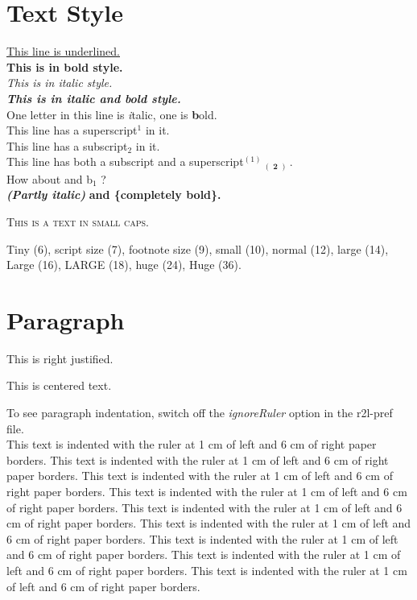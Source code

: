 \documentclass{article}
\begin{document}
\section*{Text Style}
{\underline {This line is underlined.}}\\{}
\textbf{This is in bold style.}\\{}
\textit{This is in italic style.}\\{}
\textbf{\textit{This is in italic and bold style.}}\\{}
One letter in this line is \textit{i}talic, one is \textbf{b}old.\\{}
This line has a superscript$ ^{1} $  in it.\\{}
This line has a subscript$ _{2} $  in it.\\{}
This line has both a subscript and a superscript$ ^{(1)} $ $ _{(} $ $ _{\mathbf{2}} $ $ _{)} $ .\\{}
How about  and b$ _{1} $ ?\\{}
\textbf{\textit{(Partly italic)}} \textbf{and \{completely bold\}.}


\textsc{This is a text in small caps.}

{\scriptsize Tiny (6),} {\footnotesize script size (7),} {\small footnote size (9),} small 
(10), normal (12), {\large large (14),} {\Large Large (16),} {\LARGE LARGE (18),} {\huge huge 
(24),} {\Huge Huge (36).}



\section*{Paragraph}

\begin{flushright}
This is right justified.


\end{flushright}

\begin{center}
This is centered text.


\end{center}

To see paragraph indentation, switch off the \textit{ignoreRuler} 
option in the r2l-pref file.\\{}
This text is indented with the ruler at 1 cm of left and 6 cm 
of right paper borders. This text is indented with the ruler at 
1 cm of left and 6 cm of right paper borders. This text is indented with 
the ruler at 1 cm of left and 6 cm of right paper borders. This 
text is indented with the ruler at 1 cm of left and 6 cm of right 
paper borders. This text is indented with the ruler at 1 cm of 
left and 6 cm of right paper borders. This text is indented with 
the ruler at 1 cm of left and 6 cm of right paper borders. This 
text is indented with the ruler at 1 cm of left and 6 cm of right 
paper borders. This text is indented with the ruler at 1 cm of 
left and 6 cm of right paper borders. This text is indented with 
the ruler at 1 cm of left and 6 cm of right paper borders.
\end{document}
